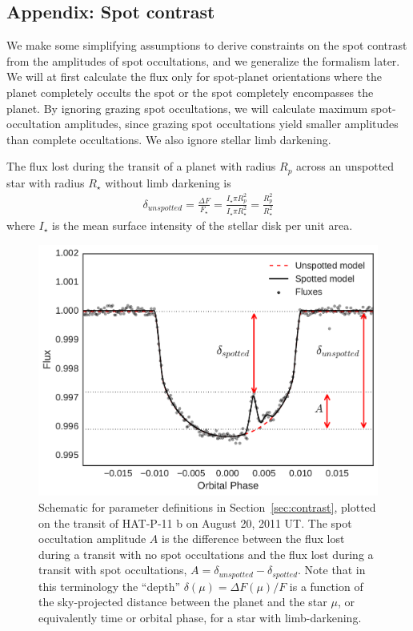\begin{subappendices}
\section*{Appendix: Spot contrast} \label{sec:appendix_contrast}

We make some simplifying assumptions to derive constraints on the spot contrast from the amplitudes of spot occultations, and we generalize the formalism later. We will at first calculate the flux only for spot-planet orientations where the planet completely occults the spot or the spot completely encompasses the planet. By ignoring grazing spot occultations, we will calculate maximum spot-occultation amplitudes, since grazing spot occultations yield smaller amplitudes than complete occultations. We also ignore stellar limb darkening.

The flux lost during the transit of a planet with radius $R_p$ across an unspotted star with radius $R_\star$ without limb darkening is
\begin{eqnarray}
\delta_{unspotted} = \frac{\Delta F}{F_\star} = \frac{I_\star \pi R_p^2}{I_\star \pi R_\star^2} = \frac{R_p^2}{R_\star^2}
\end{eqnarray}
where $I_\star$ is the mean surface intensity of the stellar disk per unit area. 
\begin{figure}
\centering
\includegraphics[scale=0.4]{stsp_hat_p_11/contrast_schematic.pdf}
\caption{Schematic for parameter definitions in Section~\ref{sec:contrast}, plotted on the transit of HAT-P-11 b on August 20, 2011 UT. The spot occultation amplitude $A$ is the difference between the flux lost during a transit with no spot occultations and the flux lost during a transit with spot occultations, $A = \delta_{unspotted} - \delta_{spotted}$. Note that in this terminology the ``depth'' $\delta(\mu) = \Delta F(\mu)/F$ is a function of the sky-projected distance between the planet and the star $\mu$, or equivalently time or orbital phase, for a star with limb-darkening.}
\label{fig:contrast_schematic}
\end{figure}


\end{subappendices}
